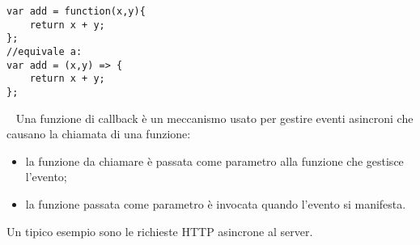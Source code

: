 \begin{lstlisting}
var add = function(x,y){
    return x + y;
};
//equivale a:
var add = (x,y) => {
    return x + y;
};
\end{lstlisting}
\ \newline
Una funzione di callback è un meccanismo usato per gestire eventi asincroni che causano la chiamata di una funzione:
\begin{itemize}
    \item la funzione da chiamare è passata come parametro alla funzione che gestisce l'evento;
    \item la funzione passata come parametro è invocata quando l'evento si manifesta.
\end{itemize}
Un tipico esempio sono le richieste HTTP asincrone al server.
\newline
\newline